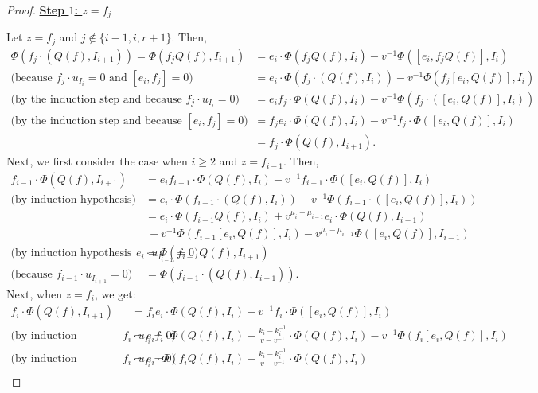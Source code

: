\documentclass[10pt,a4paper]{amsart}
\begin{document}
\begin{proof}
\underline{\textbf{Step $1$: $z=f_j$}}

Let $z=f_j$ and $j\not\in\{i-1,i,r+1\}$. Then,
\begin{align*}\Phi( f_j\cdot(Q(f),I_{i+1}))=\Phi( f_jQ(f),I_{i+1})&=e_i\cdot \Phi( f_jQ(f), I_i)-v^{-1}\Phi([e_i,f_jQ(f)], I_{i})\\
\text{(because $f_j\cdot u_{I_i}=0$ and $[e_i,f_j]=0$) }&=e_i\cdot \Phi(f_j\cdot(Q(f), I_i))-v^{-1}\Phi(f_j[e_i,Q(f)], I_{i})\\
\text{(by the induction step and because $f_j\cdot u_{I_i}=0$) }&=e_if_j\cdot \Phi(Q(f), I_i)-v^{-1}\Phi(f_j\cdot([e_i,Q(f)], I_{i}))\\
\text{(by the induction step and because $[e_i,f_j]=0$) }&=f_je_i\cdot \Phi(Q(f), I_i)-v^{-1}f_j\cdot\Phi([e_i,Q(f)], I_{i}) \\
&=  f_j\cdot\Phi(Q(f),I_{i+1}).\end{align*}
Next, we first consider the case when $i\geq 2$ and $z=f_{i-1}$. Then,
\begin{align*}
f_{i-1}\cdot\Phi( Q(f),I_{i+1})&=e_if_{i-1}\cdot \Phi( Q(f), I_i)-v^{-1}f_{i-1}\cdot\Phi([e_i,Q(f)], I_{i})\\
\text{(by induction hypothesis) }&=e_i\cdot \Phi(f_{i-1}\cdot( Q(f), I_i))-v^{-1}\Phi(f_{i-1}\cdot([e_i,Q(f)], I_{i}))\\
&=e_i\cdot \Phi(f_{i-1}Q(f),I_i) + v^{\mu_{i}-\mu_{i-1}}e_i\cdot \Phi(Q(f), I_{i-1})\\
&~-v^{-1}\Phi(f_{i-1}[e_i,Q(f)], I_{i})-v^{\mu_i-\mu_{i-1}}\Phi([e_i,Q(f)], I_{i-1})\\
\text{(by induction hypothesis and because $e_i\cdot u_{I_{i-1}}=0$) }&=\Phi(f_{i-1}Q(f), I_{i+1})\\
\text{(because $f_{i-1}\cdot u_{I_{i+1}}=0$) } &=\Phi(f_{i-1}\cdot(Q(f), I_{i+1})).
\end{align*}
Next, when $z=f_i$, we get:
\begin{align*}
f_{i}\cdot\Phi( Q(f),I_{i+1})&=f_ie_i\cdot \Phi( Q(f), I_i)-v^{-1}f_{i}\cdot\Phi([e_i,Q(f)], I_{i})\\
\text{(by induction hypothesis and because $f_i\cdot u_{I_i}=0$) }&=e_if_i\cdot \Phi( Q(f), I_i)-\frac{k_i-k_i^{-1}}{v-v^{-1}}\cdot \Phi( Q(f), I_i)-v^{-1}\Phi(f_i[e_i,Q(f)], I_{i})\\
\text{(by induction hypothesis and because $f_i\cdot u_{I_i}=0$) }&=e_i\cdot \Phi(f_iQ(f), I_i)-\frac{k_i-k_i^{-1}}{v-v^{-1}}\cdot \Phi( Q(f), I_i)\\

\end{align*}
\end{proof}
\end{document}
